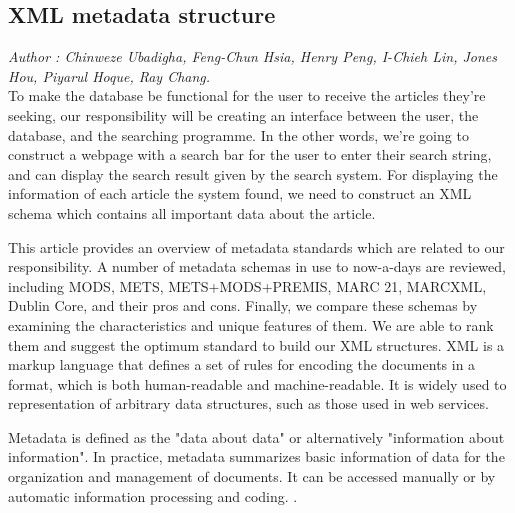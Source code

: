 \subsection{XML metadata structure}

\textit{\footnotesize Author : Chinweze Ubadigha, Feng-Chun Hsia, Henry Peng, I-Chieh Lin, Jones Hou, Piyarul Hoque, Ray Chang.}\\

To make the database be functional for the user to receive the articles they're seeking, our responsibility will be creating an interface between the user, the database, and the searching programme. 
In the other words, we're going to construct a webpage with a search bar for the user to enter their search string, and can display the search result given by the search system. 
For displaying the information of each article the system found, we need to construct an XML schema which contains all important data about the article.

This article provides an overview of metadata standards which are related to our responsibility.
A number of metadata schemas in use to now-a-days are reviewed, including MODS, METS, METS+MODS+PREMIS, MARC 21, MARCXML, Dublin Core, and  their pros and cons. 
Finally, we compare these schemas by examining the characteristics and unique features of them. 
We are able to rank them and suggest the optimum standard to build our XML structures. 
XML is a markup language that defines a set of rules for encoding the documents in a format,  which is both human-readable and machine-readable. 
It is widely used to representation of arbitrary data structures, such as those used in web services.

Metadata is defined as the "data about data" or alternatively "information about information". 
In practice, metadata summarizes basic information of data for the organization and management of documents. 
It can be accessed manually or by automatic information processing and coding. \cite{underwood2003xml}.

